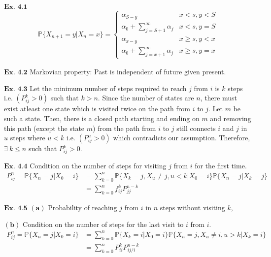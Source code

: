 \documentclass{article}
\begin{document}
${\textbf{Ex. 4.1}}$
\begin{align*}
\mathbb{P}\{X_{n+1}=y|X_n=x\} = \left\{\begin{matrix}\alpha_{S-y}&x<s, y <S\\
\alpha_{0} + \sum_{j=S+1}^{\infty}\alpha_{j}&x<s, y=S\\\alpha_{x-y}&x\geq s, y < x\\\alpha_{0} + \sum_{j=x+1}^{\infty}\alpha_{j}& x\geq s, y = x\end{matrix}\right.
\end{align*}

\vspace{0.2in}
${\textbf{Ex. 4.2}}$
Markovian property: Past is independent of future given present.

\vspace{0.2in}
${\textbf{Ex. 4.3}}$
Let the minimum number of steps required to reach $j$ from $i$ is $k$ steps i.e. $(P_{ij}^{k} > 0)$ such that $k > n$. Since the number of states are $n$, there must exist atleast one state which is visited twice on the path from $i$ to $j$. Let $m$ be such a state. Then, there is a closed path starting and ending on $m$ and removing this path (except the state $m$) from the path from $i$ to $j$ still connects $i$ and $j$ in $u$ steps where $u < k$ i.e. $(P_{ij}^{u}>0)$ which contradicts our assumption. Therefore, $\exists\ k \leq n$ such that $P_{ij}^{k} > 0$.

\vspace{0.2in}
${\textbf{Ex. 4.4}}$
Condition on the number of steps for visiting $j$ from $i$ for the first time.
\begin{align*}
P_{ij}^{n} = \mathbb{P}\{X_{n}=j|X_0=i\} &= \sum_{k=0}^{n}\mathbb{P}\{X_{k}=j,X_{u}\neq j, u < k|X_{0}=i\}\mathbb{P}\{X_{n}=j|X_{k}=j\}\\
&= \sum_{k=0}^{n}f_{ij}^{k}P_{jj}^{n-k}
\end{align*}

\vspace{0.2in}
${\textbf{Ex. 4.5}}$
$\mathbf{(a)}$
Probability of reaching $j$ from $i$ in $n$ steps without visiting $k$,

$\mathbf{(b)}$
Condition on the number of steps for the last visit to $i$ from $i$.
\begin{align*}
P_{ij}^{n} = \mathbb{P}\{X_{n}=j|X_0=i\} &= \sum_{k=0}^{n}\mathbb{P}\{X_{k}=i|X_{0}=i\}\mathbb{P}\{X_{n}=j, X_{u}\neq i, u>k |X_{k}=i\}\\
&= \sum_{k=0}^{n}P_{ii}^{k}P_{ij/i}^{n-k}
\end{align*}
\end{document}
